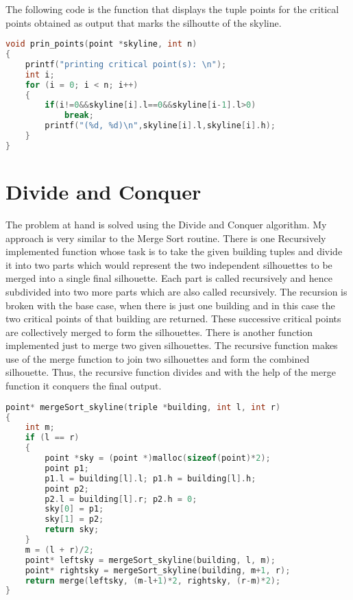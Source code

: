\documentclass{article}
\begin{document}
The following code is the function that displays the tuple points for the critical points obtained as output that marks the silhoutte of the skyline.

\begin{lstlisting}[language=c, caption=print points]
void prin_points(point *skyline, int n)
{
    printf("printing critical point(s): \n");
    int i;
    for (i = 0; i < n; i++)
    {
        if(i!=0&&skyline[i].l==0&&skyline[i-1].l>0)
            break;
        printf("(%d, %d)\n",skyline[i].l,skyline[i].h);
    }
}
\end{lstlisting}

\clearpage

\section{Divide and Conquer}

The problem at hand is solved using the Divide and Conquer algorithm. My approach is very similar to the Merge Sort routine.
There is one Recursively implemented function whose task is to take the given building tuples and divide it into two parts which would represent the two independent silhouettes to be merged into a single final silhouette. Each part is called recursively and hence subdivided into two more parts which are also called recursively.
The recursion is broken with the base case, when there is just one building and in this case the two critical points of that building are returned.
These successive critical points are collectively merged to form the silhouettes.
There is another function implemented just to merge two given silhouettes. The recursive function makes use of the merge function to join two silhouettes and form the combined silhouette. Thus, the recursive function divides and with the help of the merge function it conquers the final output.

\begin{lstlisting}[language=c, caption=recursive function]
point* mergeSort_skyline(triple *building, int l, int r)
{
    int m;
    if (l == r)
    {
        point *sky = (point *)malloc(sizeof(point)*2);
        point p1;
        p1.l = building[l].l; p1.h = building[l].h;
        point p2;
        p2.l = building[l].r; p2.h = 0;
        sky[0] = p1;
        sky[1] = p2;
        return sky;
    }
    m = (l + r)/2;
    point* leftsky = mergeSort_skyline(building, l, m);
    point* rightsky = mergeSort_skyline(building, m+1, r);
    return merge(leftsky, (m-l+1)*2, rightsky, (r-m)*2);
}
\end{lstlisting}
\end{document}
